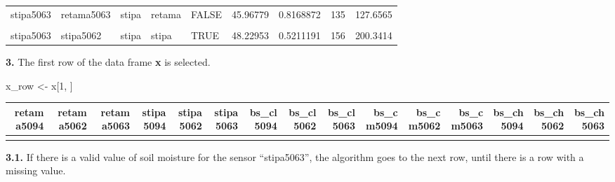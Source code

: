 \documentclass[]{article}
\newenvironment{Shaded}{\begin{snugshade}}{\end{snugshade}}
\newcommand{\DecValTok}[1]{\textcolor[rgb]{0.00,0.00,0.81}{#1}}
\newcommand{\NormalTok}[1]{#1}
\newcommand{\StringTok}[1]{\textcolor[rgb]{0.31,0.60,0.02}{#1}}
\begin{document}
\begin{table}[H]
\begin{tabular}[t]{l|l|l|l|l|r|r|r|r}
\hline
\cellcolor{gray!6}{stipa5063} & \cellcolor{gray!6}{retama5062} & \cellcolor{gray!6}{stipa} & \cellcolor{gray!6}{retama} & \cellcolor{gray!6}{FALSE} & \cellcolor{gray!6}{31.63632} & \cellcolor{gray!6}{0.8561540} & \cellcolor{gray!6}{123} & \cellcolor{gray!6}{117.2517}\\
\hline
stipa5063 & retama5063 & stipa & retama & FALSE & 45.96779 & 0.8168872 & 135 & 127.6565\\
\hline
\cellcolor{gray!6}{stipa5063} & \cellcolor{gray!6}{stipa5094} & \cellcolor{gray!6}{stipa} & \cellcolor{gray!6}{stipa} & \cellcolor{gray!6}{TRUE} & \cellcolor{gray!6}{48.28543} & \cellcolor{gray!6}{0.5162195} & \cellcolor{gray!6}{146} & \cellcolor{gray!6}{199.9074}\\
\hline
stipa5063 & stipa5062 & stipa & stipa & TRUE & 48.22953 & 0.5211191 & 156 & 200.3414\\
\hline
\end{tabular}
\end{table}

\textbf{3.} The first row of the data frame \textbf{x} is selected.

\begin{Shaded}
\begin{Highlighting}[]
\NormalTok{x_row <-}\StringTok{ }\NormalTok{x[}\DecValTok{1}\NormalTok{, ]}
\end{Highlighting}
\end{Shaded}

\begin{table}[H]
\centering
\begin{tabular}[t]{r|r|r|r|r|r|r|r|r|r|r|r|r|r|r}
\hline
retama5094 & retama5062 & retama5063 & stipa5094 & stipa5062 & stipa5063 & bs\_cl5094 & bs\_cl5062 & bs\_cl5063 & bs\_cm5094 & bs\_cm5062 & bs\_cm5063 & bs\_ch5094 & bs\_ch5062 & bs\_ch5063\\
\hline
\cellcolor{gray!6}{0.197} & \cellcolor{gray!6}{NA} & \cellcolor{gray!6}{NA} & \cellcolor{gray!6}{0.132} & \cellcolor{gray!6}{NA} & \cellcolor{gray!6}{NA} & \cellcolor{gray!6}{0.232} & \cellcolor{gray!6}{NA} & \cellcolor{gray!6}{NA} & \cellcolor{gray!6}{0.205} & \cellcolor{gray!6}{NA} & \cellcolor{gray!6}{NA} & \cellcolor{gray!6}{0.121} & \cellcolor{gray!6}{NA} & \cellcolor{gray!6}{NA}\\
\hline
\end{tabular}
\end{table}

\textbf{3.1.} If there is a valid value of soil moisture for the sensor
``stipa5063'', the algorithm goes to the next row, until there is a row
with a missing value.
\end{document}
